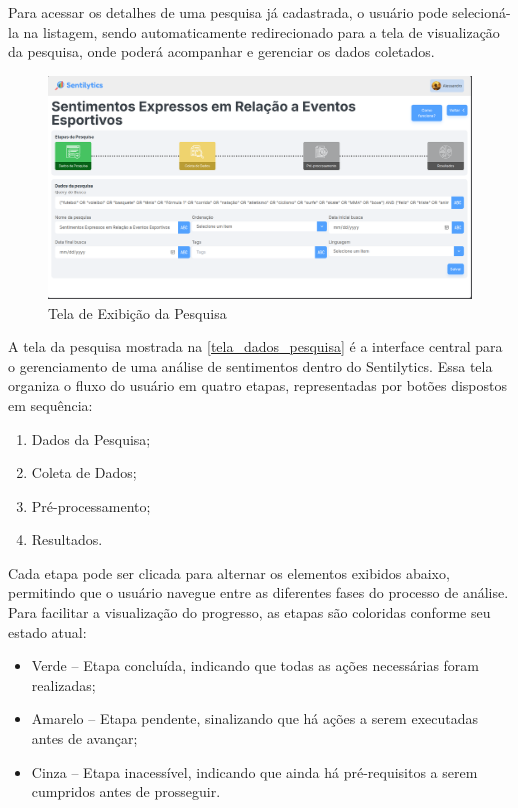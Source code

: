 \documentclass[
	12pt,				%
	oneside,			%
	a4paper,			%
	english,			%
	french,				%
	spanish,			%
	brazil				%
	]{abntex2}
\begin{document}
Para acessar os detalhes de uma pesquisa já cadastrada, o usuário pode
selecioná-la na listagem, sendo automaticamente redirecionado para a
tela de visualização da pesquisa, onde poderá acompanhar e gerenciar os
dados coletados.

\begin{figure}[htbp]
\hypertarget{tela_dados_pesquisa}{%
\caption{Tela de Exibição da Pesquisa}\label{tela_dados_pesquisa}
\begin{center}
\includegraphics[scale=0.2]{imagens/sentilytics/interface-grafica/dados-pesquisa.png}
\end{center}
}
\end{figure}

A tela da pesquisa mostrada na \autoref{tela_dados_pesquisa} é a
interface central para o gerenciamento de uma análise de sentimentos
dentro do Sentilytics. Essa tela organiza o fluxo do usuário em quatro
etapas, representadas por botões dispostos em sequência:

\begin{enumerate}
\def\labelenumi{\arabic{enumi})}
\tightlist
\item
  Dados da Pesquisa;
\item
  Coleta de Dados;
\item
  Pré-processamento;
\item
  Resultados.
\end{enumerate}

Cada etapa pode ser clicada para alternar os elementos exibidos abaixo,
permitindo que o usuário navegue entre as diferentes fases do processo
de análise. Para facilitar a visualização do progresso, as etapas são
coloridas conforme seu estado atual:

\begin{itemize}
\tightlist
\item
  Verde -- Etapa concluída, indicando que todas as ações necessárias
  foram realizadas;
\item
  Amarelo -- Etapa pendente, sinalizando que há ações a serem executadas
  antes de avançar;
\item
  Cinza -- Etapa inacessível, indicando que ainda há pré-requisitos a
  serem cumpridos antes de prosseguir.
\end{itemize}
\end{document}
